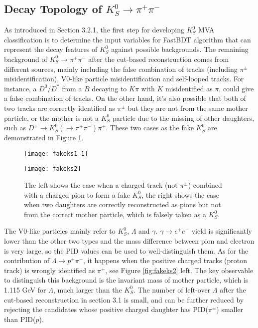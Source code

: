 

\subsection{Decay Topology of $K_S^0 \to \pi^+ \pi^-$}
As introduced in Section 3.2.1, the first step for developing $K_S^0$ MVA classification is to determine the input variables for FastBDT algorithm that can represent the decay features of $K_S^0$ against possible backgrounds.
The remaining background of  $K_S^0 \to \pi^+ \pi^-$ after the cut-based reconstruction comes from different sources, mainly including the false combination of tracks (including $\pi^{\pm}$ misidentification), V0-like particle misidentification and self-looped tracks.
For instance, a $D^0/D^*$ from a $B$ decaying to $K\pi$ with $K$ misidentified as $\pi$, could give a false combination of tracks. On the other hand, it's also possible that both of two tracks are correctly identified as $\pi^{\pm}$ but they are not from the same mother particle, or the mother is not a $K_S^0$ particle due to the missing of other daughters, such as $D^+ \to K_S^0 (  \to \pi^+ \pi^-) \pi^+$. These two cases as the fake $K_S^0$ are demonstrated in Figure \ref{fig:fakeks1}. 


\begin{figure}[htpb]
	\begin{minipage}[t]{0.5\linewidth} %
		\centering 
		\texttt{[image: fakeks1\_1]} 
	\end{minipage}%
	\begin{minipage}[t]{0.5\linewidth} 
		\centering 
		\texttt{[image: fakeks2]} 
	\end{minipage}%
	
	\caption{The left shows the case when a charged track (not $\pi^{\pm}$) combined with a charged pion to form a fake $K_S^0$, the right shows the case when two daughters are correctly reconstructed as pions but not from the correct mother particle, which is falsely taken as a $K_S^0$.}
	\label{fig:fakeks1}
\end{figure}

The V0-like particles mainly refer to $K_S^0$, $\Lambda$ and $\gamma$. $\gamma \to e^+ e^-$ yield is significantly lower than the other two types and the mass difference between pion and electron is very large, so the PID values can be used to well-distinguish them. As for the contribution of $\Lambda \to p^+ \pi^-$, it happens when the positive charged tracks (proton track) is wrongly identified as $\pi^+$, see Figure \ref{fig:fakeks2} left. The key observable to distinguish this background is the invariant mass of mother particle, which is 1.115 GeV for $\Lambda$, much larger than the $K_S^0$. The number of left-over $\Lambda$ after the cut-based reconstruction in section 3.1 is small, and can be further reduced by rejecting the candidates whose positive charged daughter has PID($\pi^{\pm}$) smaller than PID($p$).

